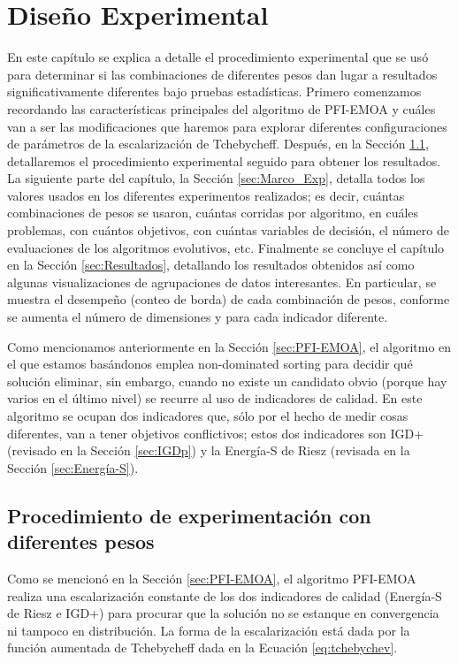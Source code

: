 
\chapter{Diseño Experimental}

En este capítulo se explica a detalle el procedimiento experimental que se usó para determinar si las combinaciones de diferentes pesos dan lugar a resultados significativamente diferentes bajo pruebas estadísticas.  Primero comenzamos recordando las características principales del algoritmo de PFI-EMOA y cuáles van a ser las modificaciones que haremos para explorar diferentes configuraciones de parámetros de la escalarización de Tchebycheff. Después, en la Sección \ref{sec:Proc_exp}, detallaremos el procedimiento experimental seguido para obtener los resultados. La siguiente parte del capítulo, la Sección \ref{sec:Marco_Exp}, detalla todos los valores usados en los diferentes experimentos realizados; es decir, cuántas combinaciones de pesos se usaron, cuántas corridas por algoritmo, en cuáles problemas, con cuántos objetivos, con cuántas variables de decisión, el número de evaluaciones de los algoritmos evolutivos, etc. Finalmente se concluye el capítulo en la Sección \ref{sec:Resultados}, detallando los resultados obtenidos así como algunas visualizaciones de agrupaciones de datos interesantes. En particular, se muestra el desempeño (conteo de borda) de cada combinación de pesos, conforme se aumenta el número de dimensiones y para cada indicador diferente. 


Como mencionamos anteriormente en la Sección \ref{sec:PFI-EMOA}, el algoritmo en el que estamos basándonos \cite{PFI} emplea non-dominated sorting para decidir qué solución eliminar, sin embargo, cuando no existe un candidato obvio (porque hay varios en el último nivel) se recurre al uso de indicadores de calidad. En este algoritmo se ocupan dos indicadores que, sólo por el hecho de medir cosas diferentes, van a tener objetivos conflictivos; estos dos indicadores son IGD+ (revisado en la Sección \ref{sec:IGDp}) y la Energía-S de Riesz (revisada en la Sección \ref{sec:Energía-S}). 


\section{Procedimiento de experimentación con diferentes pesos} \label{sec:Proc_exp}

Como se mencionó en la Sección \ref{sec:PFI-EMOA}, el algoritmo PFI-EMOA \cite{PFI} realiza una escalarización constante de los dos indicadores de calidad (Energía-S de Riesz e IGD+) para procurar que la solución no se estanque en convergencia ni tampoco en distribución. La forma de la escalarización está dada por la función aumentada de Tchebycheff dada en la Ecuación \ref{eq:tchebychev}.

